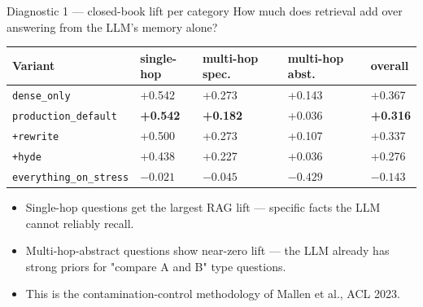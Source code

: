 \documentclass[10pt,aspectratio=169,xcolor={table}]{beamer}
\begin{document}
\begin{frame}{Diagnostic 1 --- closed-book lift per category}
  How much does retrieval add over answering from the LLM's memory alone?

  \vspace{6pt}\centering\small
  \begin{tabularx}{0.95\textwidth}{lXXXX}
    \toprule
    Variant & single-hop & multi-hop spec.\ & multi-hop abst.\ & overall \\
    \midrule
    \texttt{dense\_only} & +0.542 & +0.273 & +0.143 & +0.367 \\
    \rowcolor{teal!10}
    \texttt{production\_default} & \textbf{+0.542} & \textbf{+0.182} & +0.036 & \textbf{+0.316} \\
    \texttt{+rewrite}            & +0.500 & +0.273 & +0.107 & +0.337 \\
    \texttt{+hyde}               & +0.438 & +0.227 & +0.036 & +0.276 \\
    \rowcolor{red!8}
    \texttt{everything\_on\_stress} & $-0.021$ & $-0.045$ & $-0.429$ & $-0.143$ \\
    \bottomrule
  \end{tabularx}
  \vspace{8pt}
  \begin{itemize}\footnotesize
    \item Single-hop questions get the largest RAG lift --- specific facts the LLM cannot reliably recall.
    \item Multi-hop-abstract questions show near-zero lift --- the LLM already has strong priors for "compare A and B" type questions.
    \item This is the contamination-control methodology of Mallen et al., ACL 2023.
  \end{itemize}
\end{frame}
\end{document}
